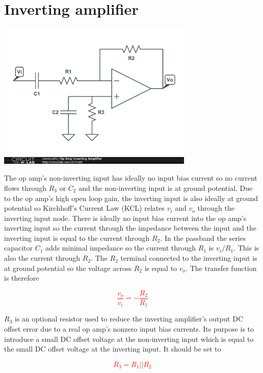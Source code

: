 \section{Inverting amplifier}
\begin{center}	\includegraphics[width=0.70\textwidth]{schematics/invertingopampamplifier.PNG}
\end{center}
The op amp's non-inverting input has ideally no input bias current so no current flows through $R_{3}$ or $C_{2}$ and the non-inverting input is at ground potential. Due to the op amp's high open loop gain, the inverting input is also ideally at ground potential so Kirchhoff's Current Law (KCL) relates $v_{i}$ and $v_{o}$ through the inverting input node. There is ideally no input bias current into the op amp's inverting input so the current through the impedance between the input and the inverting input is equal to the current through $R_{2}$. In the passband the series capacitor $C_{1}$ adds minimal impedance so the current through $R_{1}$ is $v_{i}/R_{1}$. This is also the current through $R_{2}$. The $R_{2}$ terminal connected to the inverting input is at ground potential so the voltage across $R_{2}$ is equal to $v_{o}$. The transfer function is therefore

\textcolor{red}{
\begin{equation}
\frac{v_{o}}{v_{i}} = -\frac{R_{2}}{R_{1}}
\label{eq:invertingopampamplifier}
\end{equation}
}

$R_{3}$ is an optional resistor used to reduce the inverting amplifier's output DC offset error due to a real op amp's nonzero input bias currents. Its purpose is to introduce a small DC offset voltage at the non-inverting input which is equal to the small DC offset voltage at the inverting input. It should be set to

\textcolor{red}{
\begin{equation}
R_{3} = R_{1}||R_{2}
\end{equation}
}

